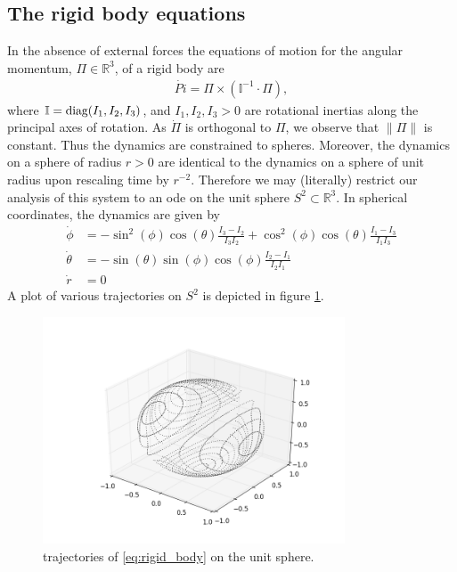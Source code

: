 \documentclass[letterpaper, 12 pt]{amsart}
\newcommand{\R}{\mathbb{R}}
\begin{document}
\subsection{The rigid body equations}
In the absence of external forces
the equations of motion for the angular momentum, $\Pi \in \R^3$,
of a rigid body are
\begin{align}
  \dot{Pi} = \Pi \times ( \mathbb{I}^{-1}\cdot \Pi),  \label{eq:rigid_body}
\end{align}
where $\mathbb{I} = {\rm diag}(I_1,I_2,I_3)$,
and $I_1,I_2,I_3 > 0$ are rotational inertias along
the principal axes of rotation.
As $\dot{\Pi}$ is orthogonal to $\Pi$, we observe that
$\| \Pi \|$ is constant.  Thus the dynamics are constrained
to spheres.  Moreover, the dynamics on a sphere of radius $r>0$
are identical to the dynamics on a sphere of unit radius
upon rescaling time by $r^{-2}$.
Therefore we may (literally) restrict our analysis of this system
to an ode on the unit sphere $S^2 \subset \R^3$.
In spherical coordinates, the dynamics are given by
\begin{align*}
  \dot{\phi} &= -\sin^2(\phi) \cos(\theta) \frac{I_3-I_2}{I_3I_2}
  + \cos^2(\phi) \cos(\theta) \frac{I_1 - I_3}{I_1 I_3} \\
  \dot{\theta} &= - \sin(\theta) \sin(\phi) \cos(\phi) \frac{I_2 - I_1}{I_2I_1} \\
  \dot{r} &= 0
\end{align*}
A plot of various trajectories on $S^2$ is depicted in figure \ref{fig:rigid_body_traj}.

\begin{figure}[p]
  \centering
  \includegraphics[width=0.8\textwidth]{./images/rigid_body_traj.png}
  \caption{trajectories of \eqref{eq:rigid_body} on the unit sphere.}
  \label{fig:rigid_body_traj}
\end{figure}
\end{document}
